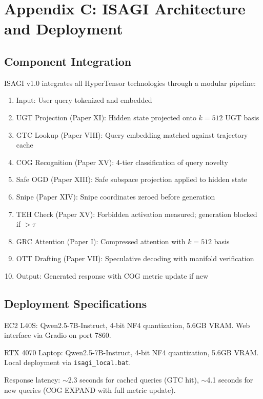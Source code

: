 \documentclass[11pt]{article}
\begin{document}
\section{Appendix C: ISAGI Architecture and Deployment}

\subsection{Component Integration}

ISAGI v1.0 integrates all HyperTensor technologies through a modular pipeline:

\begin{enumerate}[nosep]
\item Input: User query tokenized and embedded
\item UGT Projection (Paper XI): Hidden state projected onto $k=512$ UGT basis
\item GTC Lookup (Paper VIII): Query embedding matched against trajectory cache
\item COG Recognition (Paper XV): 4-tier classification of query novelty
\item Safe OGD (Paper XIII): Safe subspace projection applied to hidden state
\item Snipe (Paper XIV): Snipe coordinates zeroed before generation
\item TEH Check (Paper XV): Forbidden activation measured; generation blocked if $> \tau$
\item GRC Attention (Paper I): Compressed attention with $k=512$ basis
\item OTT Drafting (Paper VII): Speculative decoding with manifold verification
\item Output: Generated response with COG metric update if new
\end{enumerate}

\subsection{Deployment Specifications}

EC2 L40S: Qwen2.5-7B-Instruct, 4-bit NF4 quantization, 5.6GB VRAM. Web interface via Gradio on port 7860.

RTX 4070 Laptop: Qwen2.5-7B-Instruct, 4-bit NF4 quantization, 5.6GB VRAM. Local deployment via \texttt{isagi\_local.bat}.

Response latency: $\sim$2.3 seconds for cached queries (GTC hit), $\sim$4.1 seconds for new queries (COG EXPAND with full metric update).
\end{document}

